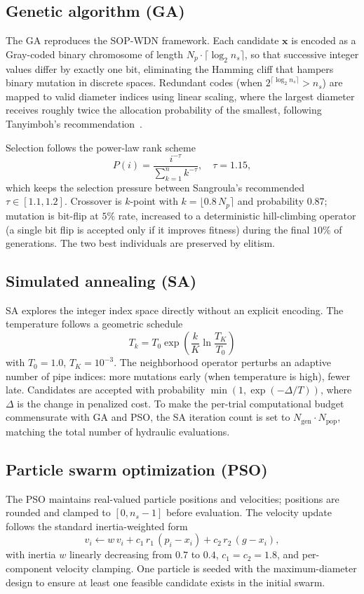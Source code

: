 \documentclass[conference]{IEEEtran}
\begin{document}
\subsection{Genetic algorithm (GA)}
The GA reproduces the SOP-WDN framework. Each candidate $\mathbf{x}$ is encoded as a Gray-coded binary chromosome of length $N_p \cdot \lceil\log_2 n_s\rceil$, so that successive integer values differ by exactly one bit, eliminating the Hamming cliff that hampers binary mutation in discrete spaces. Redundant codes (when $2^{\lceil\log_2 n_s\rceil} > n_s$) are mapped to valid diameter indices using linear scaling, where the largest diameter receives roughly twice the allocation probability of the smallest, following Tanyimboh's recommendation~\cite{tanyimboh2021}.

Selection follows the power-law rank scheme
\begin{equation}
P(i) = \frac{i^{-\tau}}{\sum_{k=1}^{n} k^{-\tau}},\quad \tau = 1.15,
\end{equation}
which keeps the selection pressure between Sangroula's recommended $\tau\in[1.1,1.2]$. Crossover is $k$-point with $k=\lfloor 0.8\,N_p\rceil$ and probability $0.87$; mutation is bit-flip at $5\%$ rate, increased to a deterministic hill-climbing operator (a single bit flip is accepted only if it improves fitness) during the final $10\%$ of generations. The two best individuals are preserved by elitism.

\subsection{Simulated annealing (SA)}
SA explores the integer index space directly without an explicit encoding. The temperature follows a geometric schedule
\begin{equation}
T_k = T_0 \exp\left(\frac{k}{K}\ln\frac{T_K}{T_0}\right)
\end{equation}
with $T_0=1.0$, $T_K=10^{-3}$. The neighborhood operator perturbs an adaptive number of pipe indices: more mutations early (when temperature is high), fewer late. Candidates are accepted with probability $\min(1, \exp(-\Delta/T))$, where $\Delta$ is the change in penalized cost. To make the per-trial computational budget commensurate with GA and PSO, the SA iteration count is set to $N_{\text{gen}}\cdot N_{\text{pop}}$, matching the total number of hydraulic evaluations.

\subsection{Particle swarm optimization (PSO)}
The PSO maintains real-valued particle positions and velocities; positions are rounded and clamped to $[0, n_s-1]$ before evaluation. The velocity update follows the standard inertia-weighted form
\begin{equation}
v_i \leftarrow w\,v_i + c_1\,r_1\,(p_i - x_i) + c_2\,r_2\,(g - x_i),
\end{equation}
with inertia $w$ linearly decreasing from $0.7$ to $0.4$, $c_1=c_2=1.8$, and per-component velocity clamping. One particle is seeded with the maximum-diameter design to ensure at least one feasible candidate exists in the initial swarm.
\end{document}
